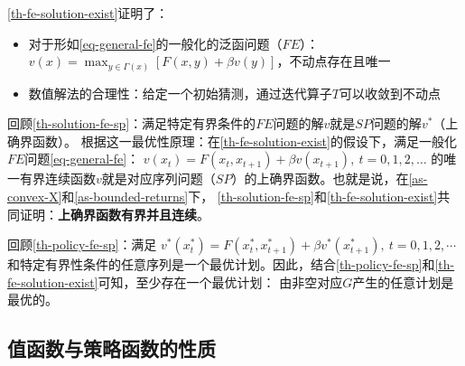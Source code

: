 \cref{th-fe-solution-exist}证明了：
\begin{itemize}
    \item 对于形如\cref{eq-general-fe}的一般化的泛函问题（$FE$）：
        $v\left(x\right)=\max_{y\in\Gamma\left(x\right)}\left[F\left(x,y\right)+\beta v\left(y\right)\right]$，不动点存在且唯一
    \item 数值解法的合理性：给定一个初始猜测，通过迭代算子$T$可以收敛到不动点
\end{itemize}

回顾\cref{th-solution-fe-sp}：满足特定有界条件的$FE$问题的解$v$就是$SP$问题的解$v^*$（上确界函数）。
根据这一最优性原理：在\cref{th-fe-solution-exist}的假设下，满足一般化$FE$问题\cref{eq-general-fe}：
$v\left(x_t\right)=F\left(x_t, x_{t+1}\right)+\beta v\left(x_{t+1}\right), ~ t=0,1,2, \ldots$
的唯一有界连续函数$v$就是对应序列问题（$SP$）的上确界函数。也就是说，在\cref{as-convex-X}和\cref{as-bounded-returns}下，
\cref{th-solution-fe-sp}和\cref{th-fe-solution-exist}共同证明：\textbf{上确界函数有界并且连续}。

回顾\cref{th-policy-fe-sp}：满足
$v^*\left(x_t^*\right) = F\left(x_t^*,x_{t+1}^*\right) + \beta v^*\left(x_{t+1}^*\right), ~ t=0,1,2,\cdots$
和特定有界性条件的任意序列是一个最优计划。因此，结合\cref{th-policy-fe-sp}和\cref{th-fe-solution-exist}可知，至少存在一个最优计划：
由非空对应$G$产生的任意计划是最优的。


\subsection{值函数与策略函数的性质}